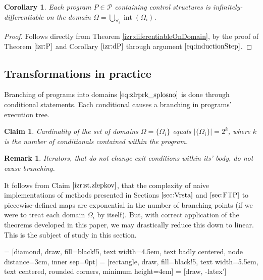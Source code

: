 \documentclass[preprint,12pt]{elsarticle}
\newcommand{\dP}{\mathcal{P}}
\DeclareMathOperator{\interior}{int}
\newtheorem{trditev}{Claim}[section]
\newtheorem{opomba}{Remark}[section]
\newtheorem{corollary}{Corollary}[section]
\begin{document}
 \begin{corollary}
\label{izr:infDiferentiableOnDomain}
  Each program $P\in\dP$ containing control structures is infinitely-differentiable on the domain $\Omega=\bigcup\limits_{\forall_i}\interior(\Omega_i)$.
 \end{corollary}
 \begin{proof}
 Follows directly from Theorem \ref{izr:diferentiableOnDomain}, by the proof of Theorem $\ref{izr:P}$ and Corollary $\ref{izr:dP}$ through argument $\eqref{eq:inductionStep}$.
 \end{proof}

\subsection{Transformations in practice} \label{sec:TransInPractice}

Branching of programs into domains $\eqref{eq:zlrprk_splosno}$ is done through conditional statements. Each conditional causes a branching in programs' execution tree.

\begin{trditev}\label{izr:st.zlepkov}
Cardinality of the set of domains $\Omega=\{\Omega_i\}$ equals $\lvert\{\Omega_i \}\rvert=2^k$, where $k$ is the number of conditionals contained within the program.
\end{trditev}
\begin{opomba}
Iterators, that do not change exit conditions within its' body, do not cause branching.
\end{opomba}

It follows from Claim $\ref{izr:st.zlepkov}$, that the complexity of naive
implementations of methods presented in Sections $\ref{sec:Vrsta}$ and
$\ref{sec:FTP}$ to piecewise-defined maps are exponential in the number of
branching points (if we were to treat each domain $\Omega_i$ by itself). But,
with correct application of the theorems developed in this paper, we may drastically reduce this down to linear. This is the subject of study in this section.
\vspace{10px}

 = [diamond, draw, fill=black!5, 
    text width=4.5em, text badly centered, node distance=3cm, inner sep=0pt]
 = [rectangle, draw, fill=black!5, 
    text width=5.5em, text centered, rounded corners, minimum height=4em]
 = [draw, -latex']
\end{document}
